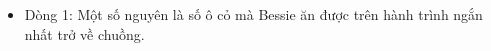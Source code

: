 \begin{itemize}
	\item     Dòng 1: Một số nguyên là số ô cỏ mà Bessie ăn được trên hành        trình ngắn nhất trở về chuồng.   
\end{itemize}

\